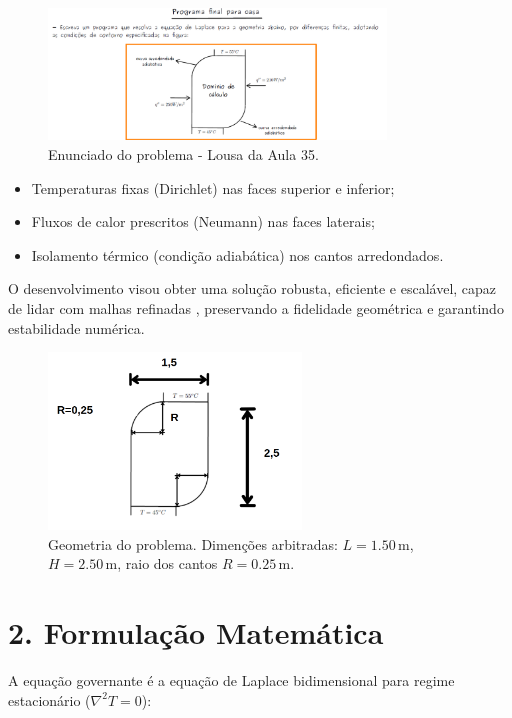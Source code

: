 \documentclass[12pt]{article}
\begin{document}
\begin{figure}[H]
    \centering
    \includegraphics[width=0.8\textwidth]{img/enunciado.png}
    \caption{Enunciado do problema - Lousa da Aula 35.}
\end{figure}

\begin{itemize}
    \item Temperaturas fixas (Dirichlet) nas faces superior e inferior;
    \item Fluxos de calor prescritos (Neumann) nas faces laterais;
    \item Isolamento térmico (condição adiabática) nos cantos arredondados.
\end{itemize}

O desenvolvimento visou obter uma solução robusta, eficiente e escalável, capaz de lidar com malhas refinadas , preservando a fidelidade geométrica e garantindo estabilidade numérica.

\begin{figure}[H]
    \centering
    \includegraphics[width=0.6\textwidth]{img/geometria.png}
    \caption{Geometria do problema. Dimenções arbitradas: $L = 1.50\,\mathrm{m}$, $H = 2.50\,\mathrm{m}$, raio dos cantos $R = 0.25\,\mathrm{m}$.}
\end{figure}

\section*{2. Formulação Matemática}

A equação governante é a equação de Laplace bidimensional para regime estacionário ($\nabla^2T=0$):
\end{document}
